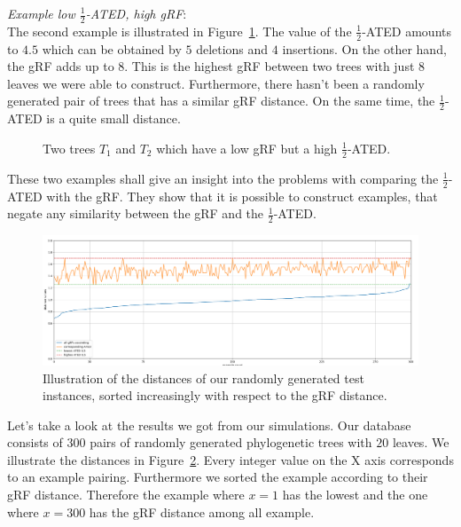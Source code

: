 \textit{Example low $\frac{1}{2}$-ATED, high gRF}:\\
The second example is illustrated in Figure~\ref{fig:lthg}. The value of the $\frac{1}{2}$-ATED amounts to $4.5$ which can be obtained by $5$ deletions and $4$ insertions. On the other hand, the gRF adds up to $8$. This is the highest gRF between two trees with just $8$ leaves we were able to construct. Furthermore, there hasn't been a randomly generated pair of trees that has a similar gRF distance. On the same time, the $\frac{1}{2}$-ATED is a quite small distance.
\begin{figure}[!ht]
	\centering
	\caption{Two trees $T_1$ and $T_2$ which have a low gRF but a high $\frac{1}{2}$-ATED.}
	\label{fig:lthg}
\end{figure} 

These two examples shall give an insight into the problems with comparing the $\frac{1}{2}$-ATED with the gRF. They show that it is possible to construct examples, that negate any similarity between the gRF and the $\frac{1}{2}$-ATED. 

\begin{figure}[!ht]
	\centering	
	\includegraphics[width=\textwidth]{figures/all_examples_grf_corr_ated.png}
	\caption{Illustration of the distances of our randomly generated test instances, sorted increasingly with respect to the gRF distance.}
	\label{fig:ex_grf_ated}
\end{figure} 
Let's take a look at the results we got from our simulations. Our database consists of $300$ pairs of randomly generated phylogenetic trees with $20$ leaves. We illustrate the distances in Figure~\ref{fig:ex_grf_ated}. Every integer value on the X axis corresponds to an example pairing. Furthermore we sorted the example according to their gRF distance. Therefore the example where $x=1$ has the lowest and the one where $x=300$ has the gRF distance among all example. 

